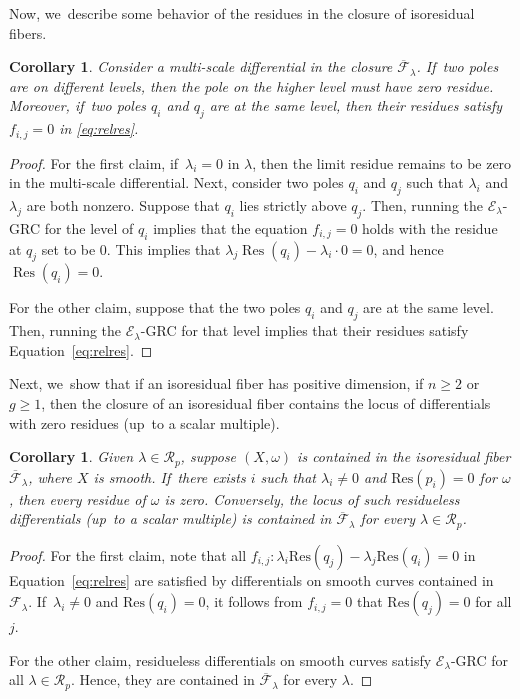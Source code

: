 \documentclass[JEP,XML,SOM,Unicode,NoFloatCountersInSection,published]{cedram}
\newcommand\calE{{\mathcal E}}
\newcommand\calF{{\mathcal F}}
\DeclareMathOperator\Res{Res}
\newtheorem{cor}[thm]{Corollary}
\theoremstyle{definition}
\begin{document}
Now, we~describe some behavior of the residues in the closure of isoresidual fibers.

\begin{cor}\label{cor:reszero}
Consider a multi-scale differential in the closure $\overline{\mathcal{F}}_{\lambda}$. If~two poles are on different levels, then the pole on the higher level must have zero residue. Moreover, if~two poles $q_i$ and $q_j$ are at the same level, then their residues satisfy $f_{i,j} = 0$ in \eqref{eq:relres}.
\end{cor}

\begin{proof}
For the first claim, if~$\lambda_i = 0$ in $\lambda$, then the limit residue remains to be zero in the multi-scale differential. Next,
consider two poles $q_{i}$ and $q_{j}$ such that $\lambda_{i}$ and $\lambda_{j}$ are both nonzero. Suppose that $q_{i}$ lies strictly above $q_{j}$.
Then, running the $\mathcal{E}_{\lambda}$-GRC for the level of $q_i$ implies that the equation $f_{i,j} = 0$ holds with the residue at $q_{j}$ set to be $0$. This implies that $\lambda_{j}\Res(q_{i})-\lambda_{i}\cdot 0=0$, and hence $\Res(q_{i})=0$.

For the other claim, suppose that the two poles $q_{i}$ and $q_{j}$ are at the same level. Then, running the $\mathcal{E}_{\lambda}$-GRC for that level implies that their residues satisfy Equation~\eqref{eq:relres}.
\end{proof}

Next, we~show that if an isoresidual fiber has positive dimension, \ie if $n\geq2$ or $g\geq1$, then the closure of an isoresidual fiber contains the locus of differentials with zero residues (up~to a scalar multiple).
\begin{cor}\label{cor:reszeros}
Given $\lambda\in \mathcal R_p$,
suppose $(X,\omega)$ is contained in the isoresidual fiber $\overline{\calF}_{\lambda}$, where $X$ is smooth. If~there exists $i$ such that $\lambda_i \neq 0$ and $\mathrm{Res}(p_i) =0$ for $\omega$,
then every residue of $\omega$ is zero. Conversely, the locus of such residueless differentials (up~to a scalar multiple) is contained in $\overline{\calF}_{\lambda}$ for every $\lambda\in \mathcal R_p$.
\end{cor}

\begin{proof}
For the first claim, note that all $f_{i,j}\colon\lambda_i \mathrm{Res}(q_j) - \lambda_j \mathrm{Res}(q_i)=0$ in Equation~\eqref{eq:relres} are satisfied by differentials on smooth curves contained in $\mathcal F_\lambda$. If~$\lambda_i \neq 0$ and $\mathrm{Res}(q_i)= 0$, it follows from $f_{i,j} = 0$ that $\mathrm{Res}(q_j)= 0$ for all $j$.

For the other claim, residueless differentials on smooth curves satisfy $\calE_{\lambda}$-GRC for all $\lambda \in \mathcal R_p$. Hence, they are contained in $\overline{\calF}_{\lambda}$ for every $\lambda$.
\end{proof}
\end{document}
